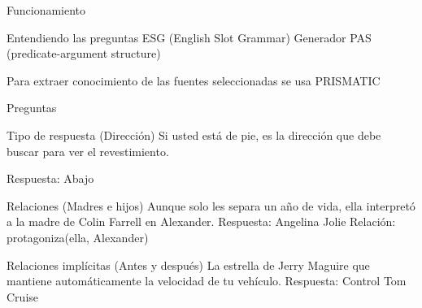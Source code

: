 \documentclass[compress]{beamer}
\begin{document}
\begin{frame}{Funcionamiento}
	\begin{block}{Entendiendo las preguntas}
		ESG (English Slot Grammar)
		Generador PAS (predicate-argument structure)
		
		Para extraer conocimiento de
		las fuentes seleccionadas se usa PRISMATIC
	\end{block}
\end{frame}


\begin{frame}{Preguntas}
	\begin{exampleblock}{Tipo de respuesta (Dirección)}		
		Si usted está de pie, es la dirección que debe buscar para ver el revestimiento.
		
		Respuesta: Abajo
	\end{exampleblock}	

	\begin{exampleblock}{Relaciones (Madres e hijos)}
		Aunque solo les separa un año de vida, ella interpretó a la madre de Colin Farrell en Alexander.
		Respuesta: Angelina Jolie
		Relación: protagoniza(ella, Alexander)
	\end{exampleblock}
	
	\begin{exampleblock}{Relaciones implícitas (Antes y después)}
		La estrella de Jerry Maguire que mantiene automáticamente la velocidad de tu vehículo.
		Respuesta: Control Tom Cruise
	\end{exampleblock}
\end{frame}
\end{document}
